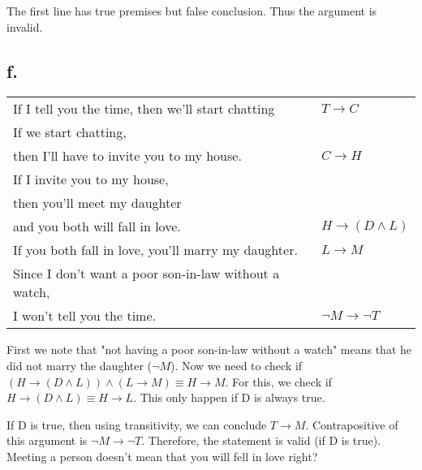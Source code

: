 \documentclass{article}
\begin{document}
The first line has true premises but false conclusion. Thus the argument is invalid.

\subsection*{f.}
\begin{tabular}{l|l}
    If I tell you the time, then we'll start chatting & $T \rightarrow C$  \\
    If we start chatting, & \\
    then I'll have to invite you to my house. & $C \rightarrow H$ \\
    If I invite you to my house, & \\
    then you'll meet my daughter & \\
    and you both will fall in love. & $H \rightarrow (D \land L)$ \\
    If you both fall in love, you'll marry my daughter.&$L \rightarrow M$\\ \hline
    Since I don't want a poor son-in-law without a watch, & \\
    I won't tell you the time. & $\neg M \rightarrow \neg T$
\end{tabular}

First we note that "not having a poor son-in-law without a watch" means that he did not marry the daughter ($\neg M$). Now we need to check if $(H \rightarrow (D \land L)) \land (L \rightarrow M) \equiv H \rightarrow M$. For this, we check if $H \rightarrow (D \land L) \equiv H \rightarrow L$. This only happen if D is always true. 

If D is true, then using transitivity, we can conclude $T \rightarrow M$. Contrapositive of this argument is $\neg M \rightarrow \neg T$. Therefore, the statement is valid (if D is true). Meeting a person doesn't mean that you will fell in love right?
\end{document}
